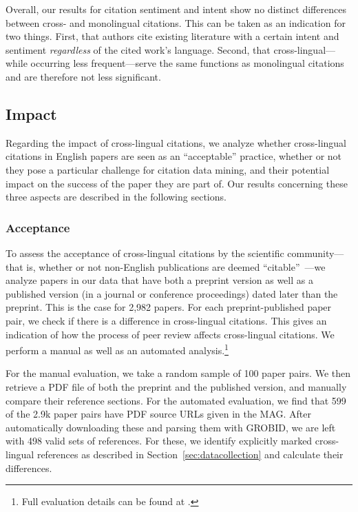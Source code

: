 Overall, our results for citation sentiment and intent show no distinct differences between cross- and monolingual citations. This can be taken as an indication for two things. First, that authors cite existing literature with a certain intent and sentiment \emph{regardless} of the cited work's language. Second, that cross-lingual---while occurring less frequent---serve the same functions as monolingual citations and are therefore not less significant.


\subsection{Impact}
Regarding the impact of cross-lingual citations, we analyze whether cross-lingual citations in English papers are seen as an ``acceptable'' practice, whether or not they pose a particular challenge for citation data mining, and their potential impact on the success of the paper they are part of. Our results concerning these three aspects are described in the following sections.

\subsubsection{Acceptance}

To assess the acceptance of cross-lingual citations by the scientific community---that is, whether or not non-English publications are deemed ``citable''~\cite{Lillis2010}---we analyze papers in our data that have both a preprint version as well as a published version (in a journal or conference proceedings) dated later than the preprint. This is the case for 2,982 papers. For each preprint-published paper pair, we check if there is a difference in cross-lingual citations. This gives an indication of how the process of peer review affects cross-lingual citations.
We perform a manual as well as an automated analysis.\footnote{Full evaluation details can be found at .}

For the manual evaluation, we take a random sample of 100 paper pairs. We then retrieve a PDF file of both the preprint and the published version, and manually compare their reference sections. For the automated evaluation, we find that 599 of the 2.9k paper pairs have PDF source URLs given in the MAG. After automatically downloading these and parsing them with GROBID, we are left with 498 valid sets of references. For these, we identify explicitly marked cross-lingual references as described in Section~\ref{sec:datacollection} and calculate their differences.

